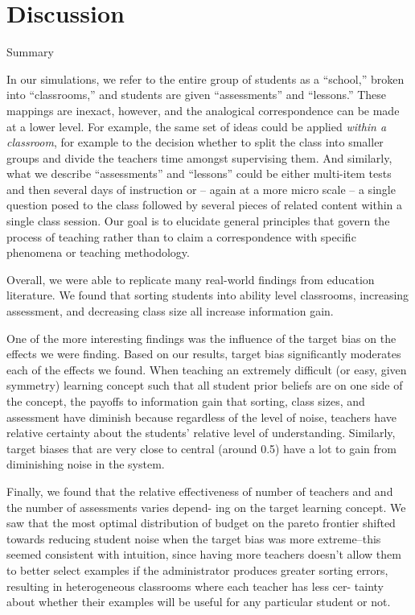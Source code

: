 \documentclass[10pt, letterpaper]{article}
\begin{document}
\section{Discussion}\label{discussion}

Summary

In our simulations, we refer to the entire group of students as a
``school,'' broken into ``classrooms,'' and students are given
``assessments'' and ``lessons.'' These mappings are inexact, however,
and the analogical correspondence can be made at a lower level. For
example, the same set of ideas could be applied \emph{within a
classroom}, for example to the decision whether to split the class into
smaller groups and divide the teachers time amongst supervising them.
And similarly, what we describe ``assessments'' and ``lessons'' could be
either multi-item tests and then several days of instruction or -- again
at a more micro scale -- a single question posed to the class followed
by several pieces of related content within a single class session. Our
goal is to elucidate general principles that govern the process of
teaching rather than to claim a correspondence with specific phenomena
or teaching methodology.

Overall, we were able to replicate many real-world findings from
education literature. We found that sorting students into ability level
classrooms, increasing assessment, and decreasing class size all
increase information gain.

One of the more interesting findings was the influence of the target
bias on the effects we were finding. Based on our results, target bias
significantly moderates each of the effects we found. When teaching an
extremely difficult (or easy, given symmetry) learning concept such that
all student prior beliefs are on one side of the concept, the payoffs to
information gain that sorting, class sizes, and assessment have diminish
because regardless of the level of noise, teachers have relative
certainty about the students' relative level of understanding.
Similarly, target biases that are very close to central (around 0.5)
have a lot to gain from diminishing noise in the system.

Finally, we found that the relative effectiveness of number of teachers
and and the number of assessments varies depend- ing on the target
learning concept. We saw that the most optimal distribution of budget on
the pareto frontier shifted towards reducing student noise when the
target bias was more extreme--this seemed consistent with intuition,
since having more teachers doesn't allow them to better select examples
if the administrator produces greater sorting errors, resulting in
heterogeneous classrooms where each teacher has less cer- tainty about
whether their examples will be useful for any particular student or not.
\end{document}
